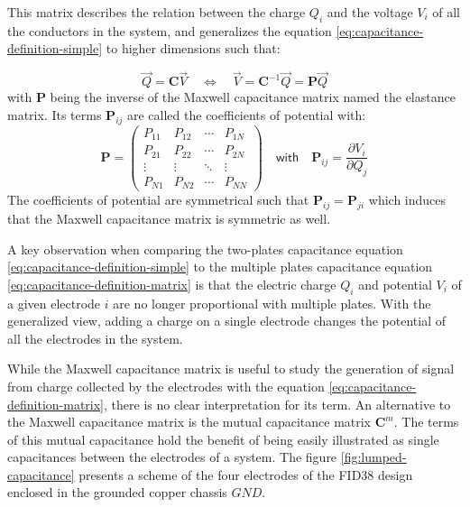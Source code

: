 This matrix describes the relation between the charge $Q_i$ and the voltage $V_i$ of all the conductors in the system, and generalizes the equation \ref{eq:capacitance-definition-simple} to higher dimensions such that:

\begin{equation} 
\label{eq:capacitance-definition-matrix}
\vec{Q} =
\bm{C} \vec{V}
\quad \Leftrightarrow \quad
\vec{V} =
\bm{C}^{-1} \vec{Q} = \bm{P} \vec{Q}
\end{equation}
with $\bm{P}$ being the inverse of the Maxwell capacitance matrix named the elastance matrix. Its terms $\bm{P}_{ij}$ are called the coefficients of potential with:
\begin{equation}
\label{eq:elastance-matrix}
\bm{P} =
\begin{pmatrix}
P_{11} & P_{12} & \cdots & P_{1N} \\ 
P_{21} & P_{22} & \cdots & P_{2N} \\ 
\vdots & \vdots & \ddots & \vdots \\ 
P_{N1} & P_{N2} & \cdots & P_{NN}
\end{pmatrix}
\quad \textsf{with} \quad
\bm{P}_{ij} = \frac{\partial V_i}{\partial Q_j}
\end{equation}
The coefficients of potential are symmetrical such that  $\bm{P}_{ij} = \bm{P}_{ji}$ which induces that the Maxwell capacitance matrix is symmetric as well.

A key observation when comparing the two-plates capacitance equation \ref{eq:capacitance-definition-simple} to the multiple plates capacitance equation \ref{eq:capacitance-definition-matrix} is that the electric charge $Q_i$ and potential $V_i$ of a given electrode $i$ are no longer proportional with multiple plates. With the generalized view, adding a charge on a single electrode changes the potential of all the electrodes in the system.

While the Maxwell capacitance matrix is useful to study the generation of signal from charge collected by the electrodes with the equation \ref{eq:capacitance-definition-matrix}, there is no clear interpretation for its term. An alternative to the Maxwell capacitance matrix is the mutual capacitance matrix $\bm{C}^m$. The terms of this mutual capacitance hold the benefit of being easily illustrated as single capacitances between the electrodes of a system. The figure \ref{fig:lumped-capacitance} presents a scheme of the four electrodes of the FID38 design enclosed in the grounded copper chassis $GND$.

